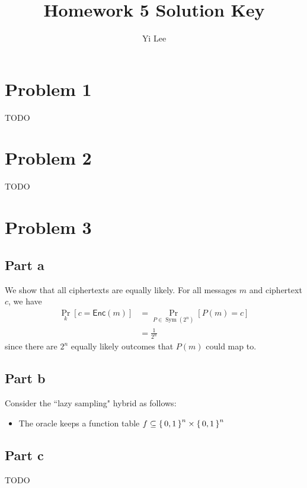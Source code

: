 \documentclass{article}
\title{Homework 5 Solution Key}
\author{Yi Lee}
\theoremstyle{definition}
\DeclareMathOperator{\Sym}{Sym}
\begin{document}


\maketitle

\section*{Problem 1}

TODO

\section*{Problem 2}

TODO

\section*{Problem 3}

\subsection*{Part a}

We show that all ciphertexts are equally likely.
For all messages $m$ and ciphertext $c$, we have
\begin{align*}
    \Pr_{k}[c=\mathsf{Enc}(m)]&=\Pr_{P\in\Sym(2^n)}[P(m)=c]\\
    &=\frac{1}{2^n}
\end{align*}
since there are $2^n$ equally likely outcomes that $P(m)$ could map to.

\subsection*{Part b}

Consider the ``lazy sampling" hybrid as follows:
\begin{itemize}
    \item The oracle keeps a function table $f\subseteq \set{0, 1}^n\times \set{0, 1}^n$
\end{itemize}

\subsection*{Part c}

TODO
\end{document}
